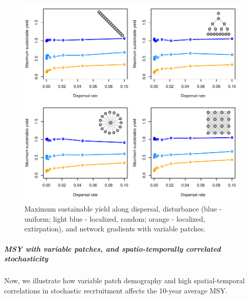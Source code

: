 \documentclass[]{article}
\let\oldsubparagraph\subparagraph
\renewcommand{\subparagraph}[1]{\oldsubparagraph{#1}\mbox{}}
\begin{document}
\begin{figure}[H]

{\centering \includegraphics{Managing_for_ecological_surprises_in_metapopulations_makeHTML_files/figure-latex/MSY with variable patches and stochasticity-1} 

}

\caption{Maximum sustainable yield along dispersal, disturbance (blue - uniform; light blue - localized, random; orange - localized, extirpation), and network gradients with variable patches.}\label{fig:MSY with variable patches and stochasticity}
\end{figure}

\hypertarget{msy-with-variable-patches-and-spatio-temporally-correlated-stochasticity}{%
\subparagraph{MSY with variable patches, and spatio-temporally
correlated
stochasticity}\label{msy-with-variable-patches-and-spatio-temporally-correlated-stochasticity}}

Now, we illustrate how variable patch demography and high
spatial-temporal correlations in stochastic recrtuitment affects the
10-year average MSY.
\end{document}
